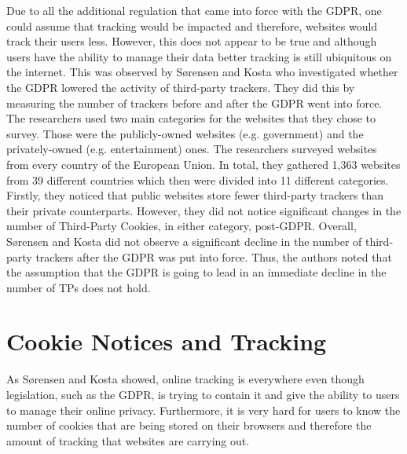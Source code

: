 \documentclass[../main.tex]{subfiles}
\begin{document}
Due to all the additional regulation that came into force with the GDPR, one could assume that tracking would be impacted and therefore, websites would track their users less. However, this does not appear to be true and although users have the ability to manage their data better tracking is still ubiquitous on the internet. This was observed by Sørensen and Kosta \cite{sorensen2019before} who investigated whether the GDPR lowered the activity of third-party trackers. They did this by measuring the number of trackers before and after the GDPR went into force. The researchers used two main categories for the websites that they chose to survey. Those were the publicly-owned websites (e.g. government) and the privately-owned (e.g. entertainment) ones. The researchers surveyed websites from every country of the European Union. In total, they gathered 1,363 websites from 39 different countries which then were divided into 11 different categories. Firstly, they noticed that public websites store fewer third-party trackers than their private counterparts. However, they did not notice significant changes in the number of Third-Party Cookies, in either category, post-GDPR. Overall, Sørensen and Kosta did not observe a significant decline in the number of third-party trackers after the GDPR was put into force. Thus, the authors noted that the assumption that the GDPR is going to lead in an immediate decline in the number of TPs does not hold. 

\section{Cookie Notices and Tracking}
\label{sec:lit_review_tracking}
As Sørensen and Kosta showed, online tracking is everywhere even though legislation, such as the GDPR, is trying to contain it and give the ability to users to manage their online privacy. Furthermore, it is very hard for users to know the number of cookies that are being stored on their browsers and therefore the amount of tracking that websites are carrying out. 
\end{document}
